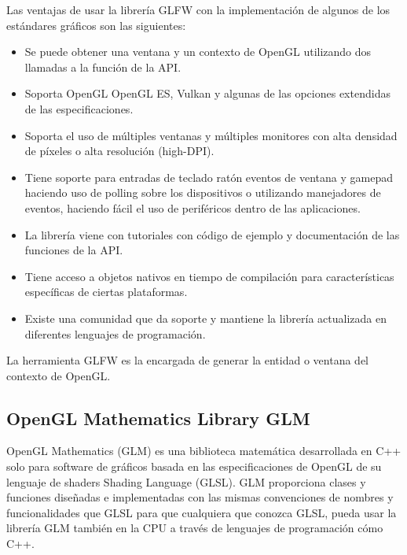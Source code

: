 \documentclass[a4paper, 17pt]{book}
\begin{document}
\vspace{1mm} %

Las ventajas de usar la librería GLFW con la implementación de algunos de los estándares gráficos son
las siguientes:

\begin{itemize}
  \item Se puede obtener una ventana y un contexto de OpenGL utilizando dos llamadas a la
  función de la API.

  \item Soporta OpenGL OpenGL ES, Vulkan y algunas de las opciones extendidas de las
  especificaciones.

  \item Soporta el uso de múltiples ventanas y múltiples monitores con alta densidad de
  píxeles o alta resolución (high-DPI).

  \item Tiene soporte para entradas de teclado ratón eventos de ventana y gamepad haciendo
  uso de polling sobre los dispositivos o utilizando manejadores de eventos, haciendo fácil
  el uso de periféricos dentro de las aplicaciones.

  \item La librería viene con tutoriales con código de ejemplo y documentación de las
  funciones de la API.

  \item Tiene acceso a objetos nativos en tiempo de compilación para características específicas
  de ciertas plataformas.

  \item Existe una comunidad que da soporte y mantiene la librería actualizada en diferentes
  lenguajes de programación.

\end{itemize}

La herramienta GLFW es la encargada de generar la entidad o ventana del contexto de OpenGL.

\subsection{OpenGL Mathematics Library GLM} 
\label{subsec:GLM}

OpenGL Mathematics (GLM) es una biblioteca matemática desarrollada en C++ solo para software
de gráficos basada en las especificaciones de OpenGL de su lenguaje de shaders Shading Language (GLSL).
GLM proporciona clases y funciones diseñadas e implementadas con las mismas convenciones de nombres
y funcionalidades que GLSL para que cualquiera que conozca GLSL, pueda usar la librería GLM también
en la CPU a través de lenguajes de programación cómo C++.
\end{document}
